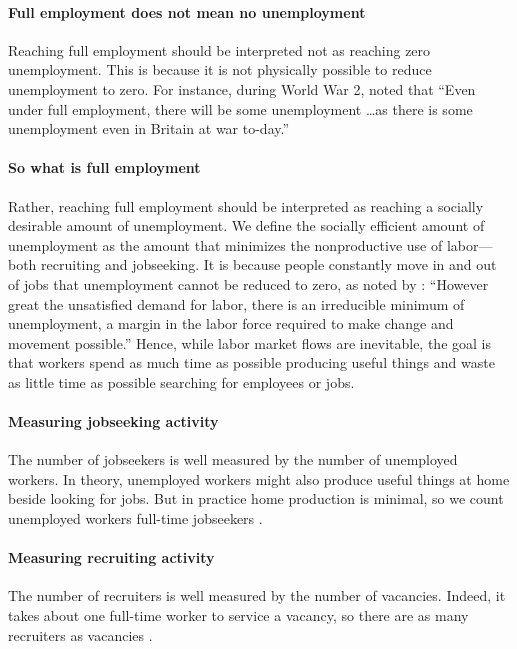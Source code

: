 \documentclass[letterpaper,12pt,leqno]{article}
\begin{document}
\paragraph{Full employment does not mean no unemployment} Reaching full employment should be interpreted not as reaching zero unemployment. This is because it is not physically possible to reduce unemployment to zero. For instance, during World War 2, \citet[p. 125]{B44} noted that ``Even under full employment, there will be some unemployment \dots as there is some unemployment even in Britain at war to-day.'' 

\paragraph{So what is full employment} Rather, reaching full employment should be interpreted as reaching a socially desirable amount of unemployment. We define the socially efficient amount of unemployment as the amount that minimizes the nonproductive use of labor---both recruiting and jobseeking. It is because people constantly move in and out of jobs that unemployment cannot be reduced to zero, as noted by \citet[p. 125]{B44}: ``However great the unsatisfied demand for labor, there is an irreducible minimum of unemployment, a margin in the labor force required to make change and movement possible.'' Hence, while labor market flows are inevitable, the goal is that workers spend as much time as possible producing useful things and waste as little time as possible searching for employees or jobs.

\paragraph{Measuring jobseeking activity} The number of jobseekers is well measured by the number of unemployed workers. In theory, unemployed workers might also produce useful things at home beside looking for jobs. But in practice home production is minimal, so we count unemployed workers full-time jobseekers \citep[pp. 9--11]{MS16}.

\paragraph{Measuring recruiting activity} The number of recruiters is well measured by the number of vacancies. Indeed, it takes about one full-time worker to service a vacancy, so there are as many recruiters as vacancies \citep[p. 11]{MS16}.
\end{document}
